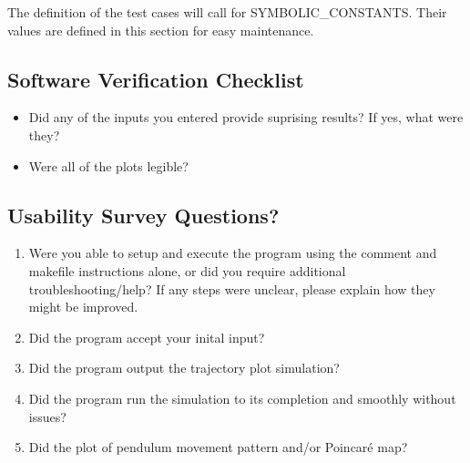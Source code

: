 \documentclass[12pt, titlepage]{article}
\begin{document}
The definition of the test cases will call for SYMBOLIC\_CONSTANTS.
Their values are defined in this section for easy maintenance.

\subsection{Software Verification Checklist} 
\label{softwarevercheck}
\begin{itemize}
	\item Did any of the inputs you entered provide suprising  results? If yes, 
	what were they?
	\item Were all of the plots legible? 
\end{itemize} 

\subsection{Usability Survey Questions?}
\begin{enumerate}
	\item Were you able to setup and execute the program using the comment
	and makefile instructions alone, or did you require additional troubleshooting/help? 
	If any steps were unclear, please explain how they might be improved.
	\item Did the program accept your inital  input?
	\item Did the program output the trajectory plot simulation?
	\item Did the program run the simulation to its completion and smoothly without issues?
	\item Did the plot of pendulum movement pattern and/or Poincar\'{e} map?
\end{enumerate}
\end{document}

